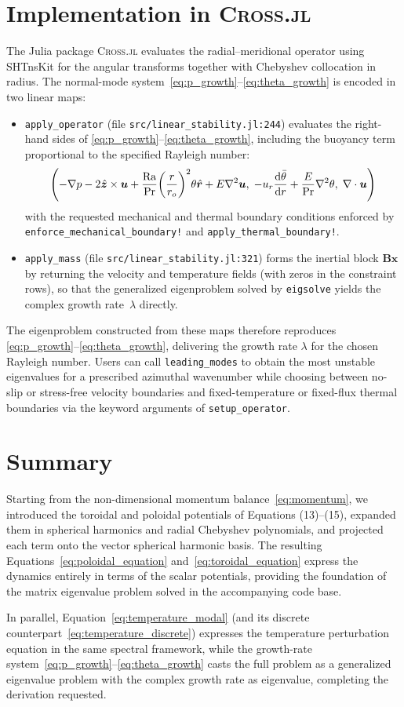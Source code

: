 \documentclass[11pt]{article}
\numberwithin{equation}{section}
\begin{document}
\section{Implementation in \textsc{Cross.jl}}
The Julia package \textsc{Cross.jl} evaluates the radial--meridional operator using SHTnsKit for the angular transforms together with Chebyshev collocation in radius. The normal-mode system~\eqref{eq:p_growth}--\eqref{eq:theta_growth} is encoded in two linear maps:
\begin{itemize}
  \item \texttt{apply\_operator} (file \texttt{src/linear\_stability.jl:244}) evaluates the right-hand sides of \eqref{eq:p_growth}--\eqref{eq:theta_growth}, including the buoyancy term proportional to the specified Rayleigh number:
  \[
    \qty(-\nabla p - 2 \hat{\bm{z}}\times \bm{u} + \frac{\mathrm{Ra}}{\mathrm{Pr}}\qty(\frac{r}{r_o})^2 \theta \hat{\bm{r}} + E \nabla^2 \bm{u},\;
          -u_r \dv{\bar{\theta}}{r} + \frac{E}{\mathrm{Pr}} \nabla^2 \theta,\;
          \nabla \cdot \bm{u})
  \]
  with the requested mechanical and thermal boundary conditions enforced by \texttt{enforce\_mechanical\_boundary!} and \texttt{apply\_thermal\_boundary!}.
  \item \texttt{apply\_mass} (file \texttt{src/linear\_stability.jl:321}) forms the inertial block $\bm{B}\bm{x}$ by returning the velocity and temperature fields (with zeros in the constraint rows), so that the generalized eigenproblem solved by \texttt{eigsolve} yields the complex growth rate~$\lambda$ directly.
\end{itemize}
The eigenproblem constructed from these maps therefore reproduces \eqref{eq:p_growth}--\eqref{eq:theta_growth}, delivering the growth rate $\lambda$ for the chosen Rayleigh number. Users can call \texttt{leading\_modes} to obtain the most unstable eigenvalues for a prescribed azimuthal wavenumber while choosing between no-slip or stress-free velocity boundaries and fixed-temperature or fixed-flux thermal boundaries via the keyword arguments of \texttt{setup\_operator}.

\section{Summary}
Starting from the non-dimensional momentum balance~\eqref{eq:momentum}, we introduced the toroidal and poloidal potentials of Equations (13)--(15), expanded them in spherical harmonics and radial Chebyshev polynomials, and projected each term onto the vector spherical harmonic basis. The resulting Equations~\eqref{eq:poloidal_equation} and~\eqref{eq:toroidal_equation} express the dynamics entirely in terms of the scalar potentials, providing the foundation of the matrix eigenvalue problem solved in the accompanying code base.

\bigskip
In parallel, Equation~\eqref{eq:temperature_modal} (and its discrete counterpart~\eqref{eq:temperature_discrete}) expresses the temperature perturbation equation in the same spectral framework, while the growth-rate system~\eqref{eq:p_growth}--\eqref{eq:theta_growth} casts the full problem as a generalized eigenvalue problem with the complex growth rate as eigenvalue, completing the derivation requested.
\end{document}
